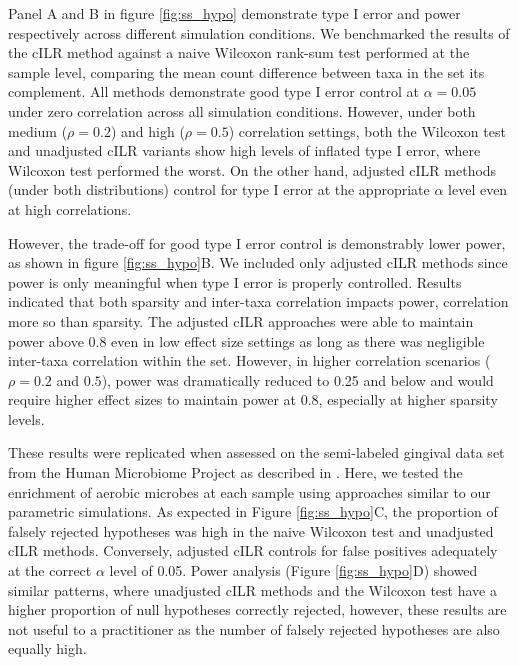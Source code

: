 \documentclass[10pt,letterpaper]{article}
\begin{document}
Panel A and B in figure \ref{fig:ss_hypo} demonstrate type I error and power respectively across different simulation conditions. We benchmarked the results of the cILR method against a naive Wilcoxon rank-sum test performed at the sample level, comparing the mean count difference between taxa in the set its complement. All methods demonstrate good type I error control at $\alpha = 0.05$ under zero correlation across all simulation conditions. However, under both medium ($\rho = 0.2$) and high ($\rho = 0.5$) correlation settings, both the Wilcoxon test and unadjusted cILR variants show high levels of inflated type I error, where Wilcoxon test performed the worst. On the other hand, adjusted cILR methods (under both distributions) control for type I error at the appropriate $\alpha$ level even at high correlations. 

However, the trade-off for good type I error control is demonstrably lower power, as shown in figure \ref{fig:ss_hypo}B. We included only adjusted cILR methods since power is only meaningful when type I error is properly controlled. Results indicated that both sparsity and inter-taxa correlation impacts power, correlation more so than sparsity. The adjusted cILR approaches were able to maintain power above 0.8 even in low effect size settings as long as there was negligible inter-taxa correlation within the set. However, in higher correlation scenarios ($\rho = 0.2$ and $0.5$), power was dramatically reduced to 0.25 and below and would require higher effect sizes to maintain power at 0.8, especially at higher sparsity levels.  

These results were replicated when assessed on the semi-labeled gingival data set from the Human Microbiome Project as described in . Here, we tested the enrichment of aerobic microbes at each sample using approaches similar to our parametric simulations. As expected in Figure \ref{fig:ss_hypo}C, the proportion of falsely rejected hypotheses was high in the naive Wilcoxon test and unadjusted cILR methods. Conversely, adjusted cILR controls for false positives adequately at the correct $\alpha$ level of 0.05. Power analysis (Figure \ref{fig:ss_hypo}D) showed similar patterns, where unadjusted cILR methods and the Wilcoxon test have a higher proportion of null hypotheses correctly rejected, however, these results are not useful to a practitioner as the number of falsely rejected hypotheses are also equally high.  
\end{document}

